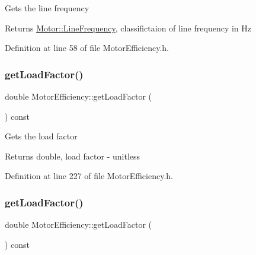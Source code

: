 Gets the line frequency

\begin{DoxyReturn}{Returns}
\hyperlink{class_motor_acee1bdf1b684ad36cb80dc2829d9fcee}{Motor\+::\+Line\+Frequency}, classifictaion of line frequency in Hz 
\end{DoxyReturn}


Definition at line 58 of file Motor\+Efficiency.\+h.

\mbox{\label{class_motor_efficiency_abff38d95856c3d33c9c48c45e77e8899}} 
\subsubsection{\texorpdfstring{get\+Load\+Factor()}{getLoadFactor()}\hspace{0.1cm}{\footnotesize\ttfamily [1/3]}}
{\footnotesize\ttfamily double Motor\+Efficiency\+::get\+Load\+Factor (\begin{DoxyParamCaption}{ }\end{DoxyParamCaption}) const\hspace{0.3cm}{\ttfamily [inline]}}

Gets the load factor

\begin{DoxyReturn}{Returns}
double, load factor -\/ unitless 
\end{DoxyReturn}


Definition at line 227 of file Motor\+Efficiency.\+h.

\mbox{\label{class_motor_efficiency_abff38d95856c3d33c9c48c45e77e8899}} 
\subsubsection{\texorpdfstring{get\+Load\+Factor()}{getLoadFactor()}\hspace{0.1cm}{\footnotesize\ttfamily [2/3]}}
{\footnotesize\ttfamily double Motor\+Efficiency\+::get\+Load\+Factor (\begin{DoxyParamCaption}{ }\end{DoxyParamCaption}) const\hspace{0.3cm}{\ttfamily [inline]}}

